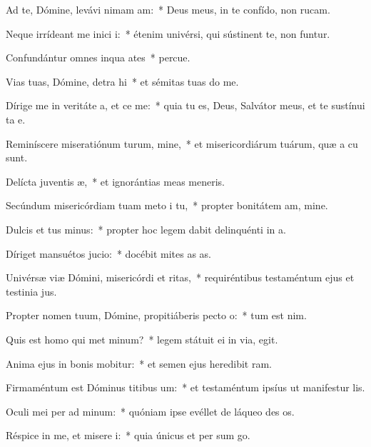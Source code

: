 \item Ad te, Dómine, levávi nimam am:~* Deus meus, in te confído, non rucam.
\item Neque irrídeant me inici i:~* étenim univérsi, qui sústinent te, non funtur.
\item Confundántur omnes inqua ates~* percue.
\item Vias tuas, Dómine, detra hi~* et sémitas tuas do me.
\item Dírige me in veritáte a, et ce me:~* quia tu es, Deus, Salvátor meus, et te sustínui ta e.
\item Reminíscere miseratiónum turum, mine,~* et misericordiárum tuárum, quæ a cu sunt.
\item Delícta juventis æ,~* et ignorántias meas  meneris.
\item Secúndum misericórdiam tuam meto i tu,~* propter bonitátem am, mine.
\item Dulcis et tus minus:~* propter hoc legem dabit delinquénti in a.
\item Díriget mansuétos  jucio:~* docébit mites as as.
\item Univérsæ viæ Dómini, misericórdi et ritas,~* requiréntibus testaméntum ejus et testinia jus.
\item Propter nomen tuum, Dómine, propitiáberis pecto o:~* tum est nim.
\item Quis est homo qui met minum?~* legem státuit ei in via,  egit.
\item Anima ejus in bonis mobitur:~* et semen ejus heredibit ram.
\item Firmaméntum est Dóminus titibus um:~* et testaméntum ipsíus ut manifestur lis.
\item Oculi mei per ad minum:~* quóniam ipse evéllet de láqueo des os.
\item Réspice in me, et misere i:~* quia únicus et per sum go.
